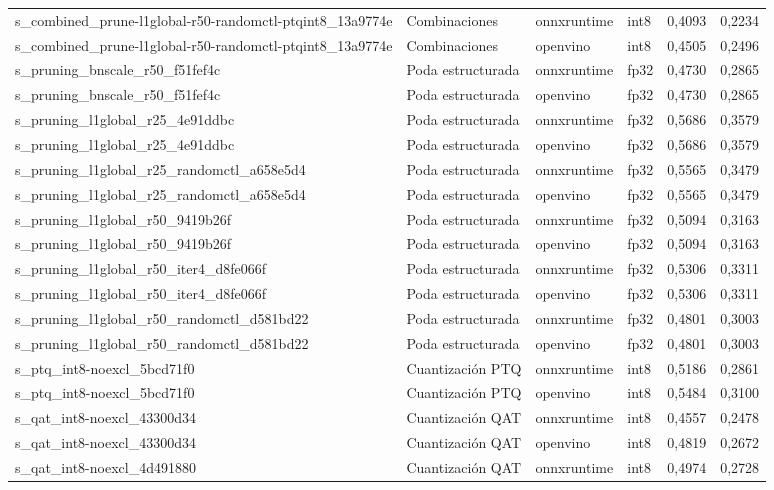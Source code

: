\begin{landscape}
\begin{table}[htbp]
\begin{adjustbox}{max width=\linewidth, max totalheight=\dimexpr\textheight-\ht\tfmedgetitle-\dp\tfmedgetitle-\ht\tfmedgenotes-\dp\tfmedgenotes-6pt\relax}
\begin{tabular}{llllrr}
    s\_combined\_prune-l1global-r50-randomctl-ptqint8\_13a9774e & Combinaciones & onnxruntime & int8 & 0,4093 & 0,2234 \\
    s\_combined\_prune-l1global-r50-randomctl-ptqint8\_13a9774e & Combinaciones & openvino & int8 & 0,4505 & 0,2496 \\
    s\_pruning\_bnscale\_r50\_f51fef4c & Poda estructurada & onnxruntime & fp32 & 0,4730 & 0,2865 \\
    s\_pruning\_bnscale\_r50\_f51fef4c & Poda estructurada & openvino & fp32 & 0,4730 & 0,2865 \\
    s\_pruning\_l1global\_r25\_4e91ddbc & Poda estructurada & onnxruntime & fp32 & 0,5686 & 0,3579 \\
    s\_pruning\_l1global\_r25\_4e91ddbc & Poda estructurada & openvino & fp32 & 0,5686 & 0,3579 \\
    s\_pruning\_l1global\_r25\_randomctl\_a658e5d4 & Poda estructurada & onnxruntime & fp32 & 0,5565 & 0,3479 \\
    s\_pruning\_l1global\_r25\_randomctl\_a658e5d4 & Poda estructurada & openvino & fp32 & 0,5565 & 0,3479 \\
    s\_pruning\_l1global\_r50\_9419b26f & Poda estructurada & onnxruntime & fp32 & 0,5094 & 0,3163 \\
    s\_pruning\_l1global\_r50\_9419b26f & Poda estructurada & openvino & fp32 & 0,5094 & 0,3163 \\
    s\_pruning\_l1global\_r50\_iter4\_d8fe066f & Poda estructurada & onnxruntime & fp32 & 0,5306 & 0,3311 \\
    s\_pruning\_l1global\_r50\_iter4\_d8fe066f & Poda estructurada & openvino & fp32 & 0,5306 & 0,3311 \\
    s\_pruning\_l1global\_r50\_randomctl\_d581bd22 & Poda estructurada & onnxruntime & fp32 & 0,4801 & 0,3003 \\
    s\_pruning\_l1global\_r50\_randomctl\_d581bd22 & Poda estructurada & openvino & fp32 & 0,4801 & 0,3003 \\
    s\_ptq\_int8-noexcl\_5bcd71f0 & Cuantización PTQ & onnxruntime & int8 & 0,5186 & 0,2861 \\
    s\_ptq\_int8-noexcl\_5bcd71f0 & Cuantización PTQ & openvino & int8 & 0,5484 & 0,3100 \\
    s\_qat\_int8-noexcl\_43300d34 & Cuantización QAT & onnxruntime & int8 & 0,4557 & 0,2478 \\
    s\_qat\_int8-noexcl\_43300d34 & Cuantización QAT & openvino & int8 & 0,4819 & 0,2672 \\
    s\_qat\_int8-noexcl\_4d491880 & Cuantización QAT & onnxruntime & int8 & 0,4974 & 0,2728 \\

\end{tabular}
\end{adjustbox}
\end{table}
\end{landscape}
